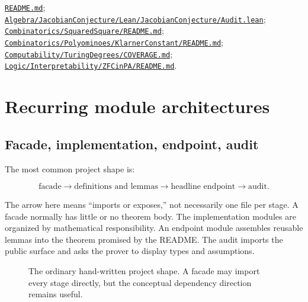 \documentclass[
  10pt,
  a4paper,
  twoside,
  open=any,
  parskip=half,
  headings=big
]{scrreprt}
\newcommand{\CommitFull}{675d0a2ff0fc624fba199e006049016ba806f40a}
\newcommand{\RepoBlobBase}{https://github.com/VladimirReshetnikov/ProveIt/blob/\CommitFull/}
\newcommand{\RepoFile}[1]{%
  \href{\RepoBlobBase\detokenize{#1}}{\nolinkurl{#1}}}
\begin{document}
\begin{sourcebox}
\RepoFile{README.md};
\RepoFile{Algebra/JacobianConjecture/Lean/JacobianConjecture/Audit.lean};
\RepoFile{Combinatorics/SquaredSquare/README.md};
\RepoFile{Combinatorics/Polyominoes/KlarnerConstant/README.md};
\RepoFile{Computability/TuringDegrees/COVERAGE.md};
\RepoFile{Logic/Interpretability/ZFCinPA/README.md}.
\end{sourcebox}

\chapter{Recurring module architectures}
\label{chap:patterns}

\section{Facade, implementation, endpoint, audit}

The most common project shape is:

\[
\text{facade} \longrightarrow
\text{definitions and lemmas} \longrightarrow
\text{headline endpoint} \longrightarrow
\text{audit}.
\]

The arrow here means ``imports or exposes,'' not necessarily one file per
stage.  A facade normally has little or no theorem body.  The implementation
modules are organized by mathematical responsibility.  An endpoint module
assembles reusable lemmas into the theorem promised by the README.  The audit
imports the public surface and asks the prover to display types and
assumptions.

\begin{figure}[htbp]
\centering
{}
\caption{The ordinary hand-written project shape.  A facade may import every stage directly, but the conceptual dependency direction remains useful.}
\label{fig:ordinary-shape}
\end{figure}
\end{document}

